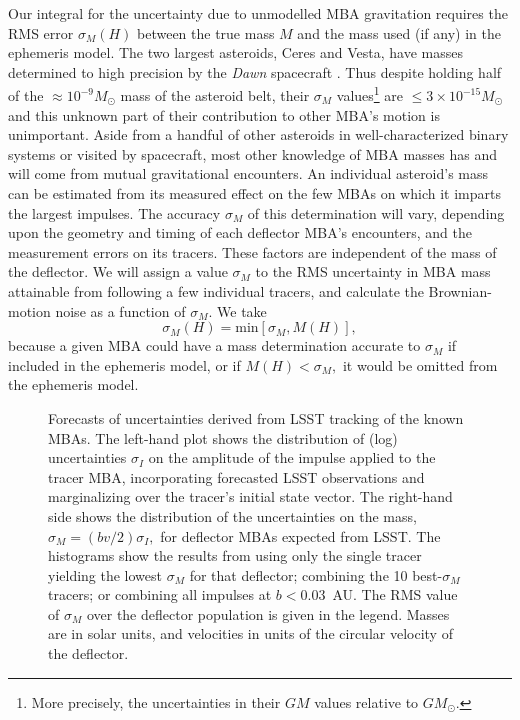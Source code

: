 \documentclass[linenumbers, onecolumn]{aastex631}
\begin{document}
Our integral for the uncertainty due to unmodelled MBA gravitation
requires the RMS error $\sigma_M(H)$ between the true mass $M$ and the
mass used (if any) in the ephemeris model.
The two largest asteroids, Ceres and Vesta, have masses determined to
high precision by the \textit{Dawn} spacecraft \citep{Ceres,Vesta}.  Thus despite holding
half of the $\approx 10^{-9} M_\odot$ mass of the asteroid belt, their $\sigma_M$
values\footnote{More precisely, the uncertainties in their $GM$ values
  relative to $GM_\odot$.} are 
$\le3\times10^{-15} M_\odot$ and
this unknown part of their contribution to other MBA's motion is 
unimportant.  Aside from a handful of other asteroids in
well-characterized binary systems or visited by spacecraft, most other knowledge of MBA masses
has and will come from mutual gravitational encounters.   An
individual asteroid's mass can be estimated from its measured effect  on the
few MBAs on which it imparts the largest impulses.  The accuracy
$\sigma_M$ of this determination will vary, depending upon the
geometry  and timing of
each deflector MBA's encounters, and the measurement errors on its tracers.  These
factors are independent of the mass of the deflector.  We will
assign a value $\sigma_M$ to the RMS uncertainty in MBA mass
attainable from following a few individual tracers, and calculate
the Brownian-motion noise as a function of $\sigma_M.$  We take
\begin{equation}
  \sigma_M(H) = \textrm{min}\left[ \sigma_M, M(H) \right],
\end{equation}
because a given MBA could have a mass determination accurate to
$\sigma_M$ if included in the ephemeris model, or if $M(H)<\sigma_M,$
it would be omitted from the ephemeris model.


\begin{figure}
  \caption{Forecasts of uncertainties derived from LSST tracking of the known MBAs.  The left-hand plot shows the distribution of (log) uncertainties $\sigma_I$ on the amplitude of the impulse applied to the tracer MBA, incorporating forecasted LSST observations and marginalizing over the tracer's initial state vector.  The right-hand side shows the distribution of the uncertainties on the mass, $\sigma_M=(bv/2)\sigma_I,$ for deflector MBAs expected from LSST.  The histograms show the results from using only the single tracer yielding the lowest $\sigma_M$ for that deflector; combining the 10 best-$\sigma_M$ tracers; or combining all impulses at $b<0.03$~AU.  The RMS value of $\sigma_M$ over the deflector population is given in the legend.  Masses are in solar units, and velocities in units of the circular velocity of the deflector.}
  \label{fig:sigmaI}
\end{figure}
\end{document}
